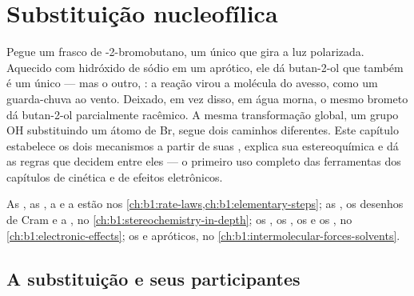 \chapter{Substituição nucleofílica}\label{ch:b1:nucleophilic-substitution}

Pegue um frasco de -2-bromobutano, um único  que gira
a luz polarizada. Aquecido com hidróxido de sódio em um 
aprótico, ele dá butan-2-ol que também é um único  --- mas o
outro, : a reação virou a molécula do avesso, como um guarda-chuva
ao vento. Deixado, em vez disso, em água morna, o mesmo brometo dá
butan-2-ol parcialmente racêmico. A mesma transformação global, um grupo
OH substituindo um átomo de Br, segue dois caminhos diferentes. Este
capítulo estabelece os dois mecanismos a partir de suas , explica sua estereoquímica e dá as regras que decidem entre
eles --- o primeiro uso completo das ferramentas dos capítulos de
cinética e de efeitos eletrônicos.

\begin{recall}
As , as , a  e a
 estão nos
\cref{ch:b1:rate-laws,ch:b1:elementary-steps}; as , os
desenhos de Cram e a , no
\cref{ch:b1:stereochemistry-in-depth}; os , os , os
 e os , no \cref{ch:b1:electronic-effects}; os
 e apróticos, no
\cref{ch:b1:intermolecular-forces-solvents}.
\end{recall}

\section{A substituição e seus participantes}

